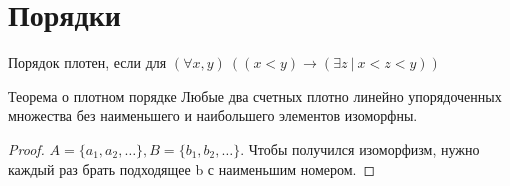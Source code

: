 \section{Порядки}

\begin{definition}
	Порядок плотен, если для $(\forall x, y)\ ( (x < y) \rightarrow (\exists z \ | \ x < z < y) )$
\end{definition}

\begin{theorem}{Теорема о плотном порядке}
	Любые два счетных плотно линейно упорядоченных множества без наименьшего и наибольшего элементов изоморфны.
\end{theorem}
\begin{proof}
	$A = \{a_1, a_2, \ldots\}, B = \{b_1, b_2, \ldots\}$.
	Чтобы получился изоморфизм, нужно каждый раз брать подходящее b с наименьшим номером.
\end{proof}